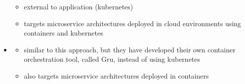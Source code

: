 \begin{itemize}
\begin{itemize}
        \item external to application (\gls{kubernetes})
        \item targets microservice architectures deployed in cloud environments using containers and \gls{kubernetes}
      \end{itemize}
    \item \cite{gru}
      \begin{itemize}
        \item similar to this approach, but they have developed their own container orchestration tool, called Gru, instead of using \gls{kubernetes}
        \item also targets microservice architectures deployed in containers
      \end{itemize}
  \end{itemize}
